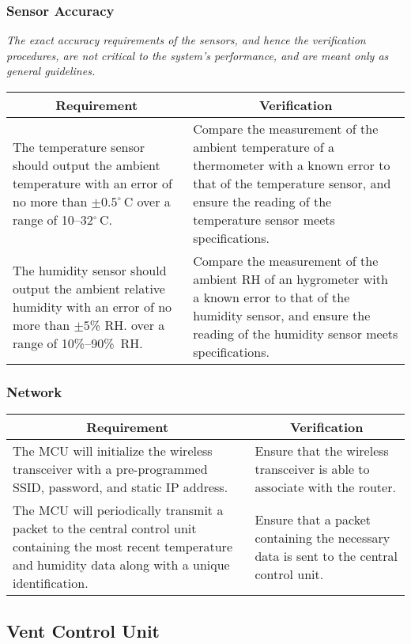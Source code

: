 \subsubsection{Sensor Accuracy}
\label{sensor_acc}
{\em The exact accuracy requirements of the sensors, and hence the verification procedures, are not critical to the system's performance, and are meant only as general guidelines. }

\noindent
\begin{tabular}{|p{\mytabwidth}|p{\mytabwidth}|}
\hline
\multicolumn{1}{|c|}{Requirement} & \multicolumn{1}{|c|}{Verification}\\
\hline\hline
The temperature sensor should output the ambient temperature with an error of no more than $\pm0.5^\circ\,$C over a range of 10--32$^\circ$\,C. &
Compare the measurement of the ambient temperature of a thermometer with a known error to that of the temperature sensor, and ensure the reading of the temperature sensor meets specifications. \\
\hline
The humidity sensor should output the ambient relative humidity with an error of no more than $\pm 5$\% RH. over a range of 10\%--90\%\ RH. &
Compare the measurement of the ambient RH of an hygrometer with a known error to that of the humidity sensor, and ensure the reading of the humidity sensor meets specifications. \\
\hline
\end{tabular}

\subsubsection{Network}
\begin{tabular}{|p{\mytabwidth}|p{\mytabwidth}|}
\hline
\multicolumn{1}{|c|}{Requirement} & \multicolumn{1}{|c|}{Verification}\\
\hline\hline
The MCU will initialize the wireless transceiver with a pre-programmed SSID, password, and static IP address. &
Ensure that the wireless transceiver is able to associate with the router. \\
\hline
The MCU will periodically transmit a packet to the central control unit containing the most recent temperature and humidity data along with a unique identification. &
Ensure that a packet containing the necessary data is sent to the central control unit. \\
\hline
\end{tabular}

\subsection{Vent Control Unit}
